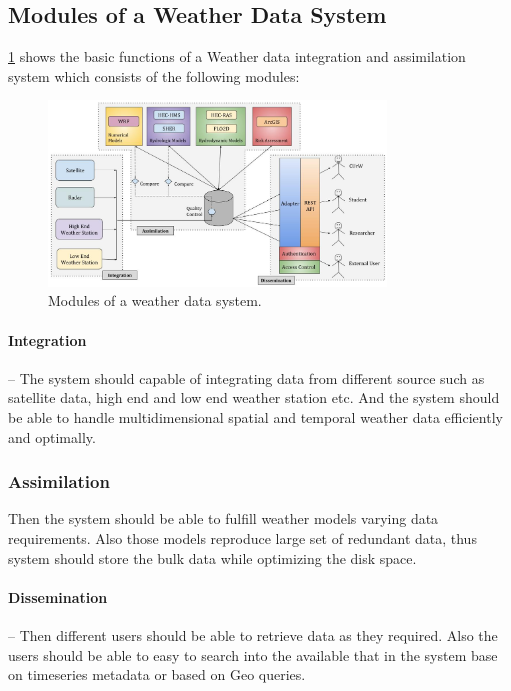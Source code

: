 \subsection{Modules of a Weather Data System}
\label{subse:modules_weather_data_integration_sys}

\cref{fi:wdia_components} shows the basic functions of a Weather data integration and assimilation system which consists of the following modules:
\begin{figure}[htbp]
\centerline{\includegraphics[width=0.8\textwidth]{method/misc/weather_data_system_components.jpg}}
\caption{Modules of a weather data system.}
\label{fi:wdia_components}
\end{figure}

\paragraph{Integration}-- The system should capable of integrating data from different source such as satellite data, high end and low end weather station etc. And the system should be able to handle multidimensional spatial and temporal weather data efficiently and optimally. 
\subsubsection{Assimilation}
Then the system should be able to fulfill weather models varying data requirements. Also those models reproduce large set of redundant data, thus system should store the bulk data while optimizing the disk space.
\paragraph{Dissemination}-- Then different users should be able to retrieve data as they required. Also the users should be able to easy to search into the available that in the system base on timeseries metadata or based on Geo queries.


